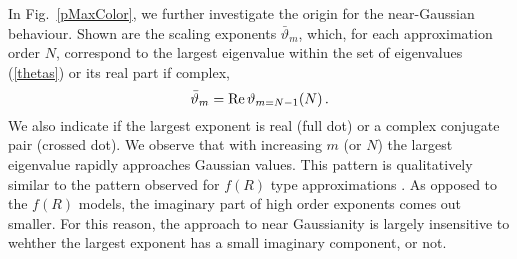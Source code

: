 \documentclass[notitlepage,eqsecnum,bm,amsmath,preprintnumbers,superscriptaddress,nofootinbib,aps,11pt]{revtex4-1}
\def\eq#1{(\ref{#1})}
\def\beq{\begin{equation}}
\def\eeq{\end{equation}}
\begin{document}
In Fig.~\ref{pMaxColor}, we further investigate the origin for the near-Gaussian behaviour. Shown  are the scaling exponents $\bar\vartheta_m$, which, for each approximation order $N$, correspond to the largest eigenvalue within the set of eigenvalues \eq{thetas}   or its real part if complex,
  \beq
  \bar\vartheta_m={\rm Re}\,\vartheta_{m=N-1}(N)\,.
  \eeq
We also indicate if the largest exponent is real (full dot) or a complex conjugate pair (crossed dot). We observe that with increasing $m$ (or $N$) the largest eigenvalue rapidly approaches Gaussian values. This pattern is qualitatively similar to the pattern observed for $f(R)$ type approximations \cite{Falls:2014tra}. As opposed to the $f(R)$ models, the imaginary part of high order exponents comes out smaller. For this reason, the approach to near Gaussianity is largely insensitive to wehther the largest exponent has a small imaginary component, or not.
 
\end{document}
